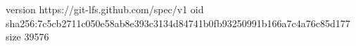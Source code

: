 version https://git-lfs.github.com/spec/v1
oid sha256:7c5cb2711c050e58ab8e393c3134d84741b0fb93250991b166a7c4a76c85d177
size 39576
